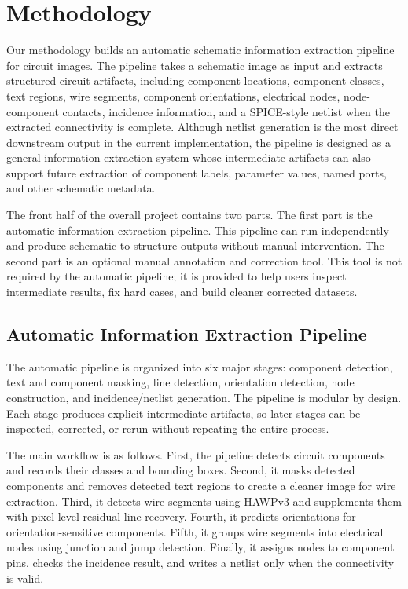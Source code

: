 \section{Methodology}
\label{sec:methodology}

Our methodology builds an automatic schematic information extraction pipeline for circuit images. The pipeline takes a schematic image as input and extracts structured circuit artifacts, including component locations, component classes, text regions, wire segments, component orientations, electrical nodes, node-component contacts, incidence information, and a SPICE-style netlist when the extracted connectivity is complete. Although netlist generation is the most direct downstream output in the current implementation, the pipeline is designed as a general information extraction system whose intermediate artifacts can also support future extraction of component labels, parameter values, named ports, and other schematic metadata.

The front half of the overall project contains two parts. The first part is the automatic information extraction pipeline. This pipeline can run independently and produce schematic-to-structure outputs without manual intervention. The second part is an optional manual annotation and correction tool. This tool is not required by the automatic pipeline; it is provided to help users inspect intermediate results, fix hard cases, and build cleaner corrected datasets.

\subsection{Automatic Information Extraction Pipeline}
\label{subsec:auto-info-extraction}

The automatic pipeline is organized into six major stages: component detection, text and component masking, line detection, orientation detection, node construction, and incidence/netlist generation. The pipeline is modular by design. Each stage produces explicit intermediate artifacts, so later stages can be inspected, corrected, or rerun without repeating the entire process.

The main workflow is as follows. First, the pipeline detects circuit components and records their classes and bounding boxes. Second, it masks detected components and removes detected text regions to create a cleaner image for wire extraction. Third, it detects wire segments using HAWPv3 and supplements them with pixel-level residual line recovery. Fourth, it predicts orientations for orientation-sensitive components. Fifth, it groups wire segments into electrical nodes using junction and jump detection. Finally, it assigns nodes to component pins, checks the incidence result, and writes a netlist only when the connectivity is valid.

